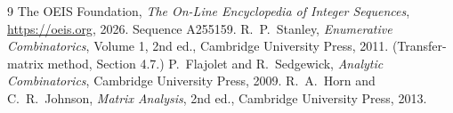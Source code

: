 \documentclass[11pt,a4paper]{article}
\theoremstyle{plain}
\theoremstyle{definition}
\begin{document}
\begin{thebibliography}{9}
 The OEIS Foundation, \emph{The On-Line Encyclopedia of Integer
Sequences}, \url{https://oeis.org}, 2026. Sequence A255159.
 R.~P.~Stanley, \emph{Enumerative Combinatorics}, Volume 1, 2nd ed.,
Cambridge University Press, 2011. (Transfer-matrix method, Section 4.7.)
 P.~Flajolet and R.~Sedgewick, \emph{Analytic Combinatorics}, Cambridge
University Press, 2009.
 R.~A.~Horn and C.~R.~Johnson, \emph{Matrix Analysis}, 2nd ed., Cambridge
University Press, 2013.
\end{thebibliography}
\end{document}
